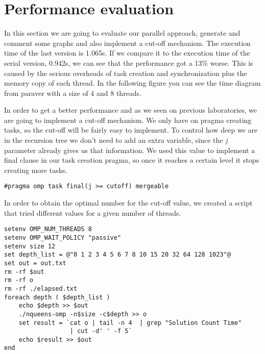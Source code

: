 \section{Performance evaluation}
\justify
In this section we are going to evaluate our parallel approach, generate and comment some graphs and also implement a cut-off mechanism.
\justify
The execution time of the last version is 1.065s. If we compare it to the execution time of the serial version, 0.942s, we can see that the performance got a 13\% worse. This is caused by the serious overheads of task creation and synchronization plus the memory copy of each thread. In the following figure you can see the time diagram from paraver with a size of 4 and 8 threads.

\justify
In order to get a better performance and as we seen on previous laboratories, we are going to implement a cut-off mechanism.
\justify
We only have on pragma creating tasks, so the cut-off will be fairly easy to implement. To control how deep we are in the recursion tree we don't need to add an extra variable, since the \textit{j} parameter already gives us that information. We used this value to implement a final clause in our task creation pragma, so once it reaches a certain level it stops creating more tasks.   
\begin{lstlisting}
#pragma omp task final(j >= cutoff) mergeable
\end{lstlisting}
\justify
In order to obtain the optimal number for the cut-off value, we created a script that tried different values for a given number of threads.
\begin{lstlisting}[escapechar=@]
setenv OMP_NUM_THREADS 8
setenv OMP_WAIT_POLICY "passive"
setenv size 12
set depth_list = @"0 1 2 3 4 5 6 7 8 10 15 20 32 64 128 1023"@
set out = out.txt
rm -rf $out
rm -rf o
rm -rf ./elapsed.txt
foreach depth ( $depth_list )
    echo $depth >> $out
    ./nqueens-omp -n$size -c$depth >> o
    set result = `cat o | tail -n 4  | grep "Solution Count Time"
                  | cut -d' ' -f 5`
    echo $result >> $out
end
\end{lstlisting}


